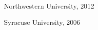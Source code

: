 \documentclass[]{winter-resume-openfont}
\begin{document}
\begin{minipage}[t]{0.65\textwidth}
\begin{tightemize}
\item[] Northwestern University, 2012
\end{tightemize}

\begin{tightemize}

\item[] Syracuse University, 2006
\end{tightemize}
\sectionsep







\end{minipage} 
\hfill
\end{document}
